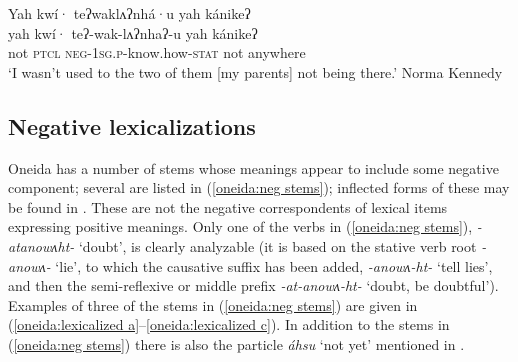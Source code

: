 \documentclass[output=paper,colorlinks,citecolor=brown]{langscibook}
\begin{document}
\ea\label{oneida:2 neg}
    {\glll Yah kwí· teʔwaklʌʔnhá·u yah kánikeʔ  \\
    yah kwí· teʔ-wak-lʌʔnhaʔ-u yah kánikeʔ  \\
    not \textsc{ptcl} \textsc{neg-1sg.p}-know.how-\textsc{stat} not anywhere  \\}
    \glt `I wasn't used to the two of them [my parents] not being there.' Norma Kennedy \citep[118 (8)]{MichelsonEtAl2016}
\z


\subsection{Negative lexicalizations}
\label{oneida:sec:lex}

Oneida has a number of stems whose meanings appear to include some negative component; several are listed in (\ref{oneida:neg stems});  inflected forms of these may be found in \citet{MichelsonDoxtator2002}. These  are not  the negative correspondents of lexical items expressing positive meanings. Only one of the verbs in (\ref{oneida:neg stems}), \mbox{\textit{-atanowʌht-}} `doubt', is clearly analyzable (it is based on the stative verb root \textit{-anowʌ-} `lie', to which the causative suffix has been added, \textit{-anowʌ-ht-} `tell lies', and then the semi-reflexive or middle prefix \textit{-at-anowʌ-ht-} `doubt, be doubtful'). Examples of three of the stems in (\ref{oneida:neg stems}) are given in (\ref{oneida:lexicalized a}--\ref{oneida:lexicalized c}). In addition to the stems in (\ref{oneida:neg stems}) there is also the particle \textit{áhsu} `not yet' mentioned in .
\end{document}
